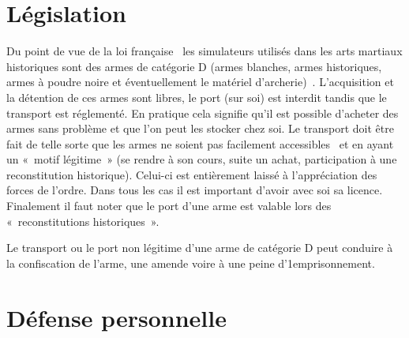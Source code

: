 \section{Législation}


Du point de vue de la loi française~\footnotemark{} les simulateurs utilisés dans les arts martiaux historiques sont des armes de catégorie D (armes blanches, armes historiques, armes à poudre noire et éventuellement le matériel d'archerie)~\cite[p.~249]{Morel:2008:ProtegorGuidePratique}.
L'acquisition et la détention de ces armes sont libres, le port (sur soi) est interdit tandis que le transport est réglementé.
En pratique cela signifie qu'il est possible d'acheter des armes sans problème et que l'on peut les stocker chez soi.
Le transport doit être fait de telle sorte que les armes ne soient pas facilement accessibles~\footnotemark{} et en ayant un « motif légitime » (se rendre à son cours, suite un achat, participation à une reconstitution historique).
Celui-ci est entièrement laissé à l'appréciation des forces de l'ordre.
Dans tous les cas il est important d'avoir avec soi sa licence.
Finalement il faut noter que le port d'une arme est valable lors des « reconstitutions historiques ».

Le transport ou le port non légitime d'une arme de catégorie D peut conduire à la confiscation de l'arme, une amende voire à une peine d'1emprisonnement.



\section{Défense personnelle}


